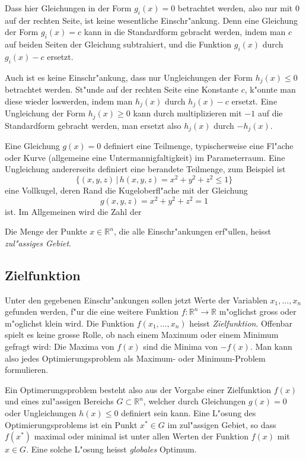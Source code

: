 Dass hier Gleichungen in der Form $g_i(x)=0$ betrachtet werden, also
nur mit $0$ auf der rechten Seite, ist keine wesentliche Einschr"ankung.
Denn eine Gleichung der Form $g_i(x)=c$ kann in die Standardform gebracht
werden, indem man $c$ auf beiden Seiten der Gleichung subtrahiert,
und die Funktion $g_i(x)$ durch $g_i(x)-c$ ersetzt.

Auch ist es keine Einschr"ankung, dass nur Ungleichungen der Form 
$h_j(x)\le 0$ betrachtet werden. St"unde auf der rechten Seite eine
Konstante $c$, k"onnte man diese wieder loswerden, indem man $h_j(x)$
durch $h_j(x)-c$ ersetzt. Eine Ungleichung der Form $h_j(x)\ge 0$
kann durch multiplizieren mit $-1$ auf die Standardform gebracht werden,
man ersetzt also $h_j(x)$ durch $-h_j(x)$.

Eine Gleichung $g(x)=0$ definiert eine Teilmenge, typischerweise eine
Fl"ache oder Kurve (allgemeine eine Untermannigfaltigkeit) im 
Parameterraum.
Eine Ungleichung andererseits definiert eine berandete Teilmenge,
zum Beispiel ist
\[
\{(x,y,z)\,|\,h(x,y,z)=x^2+y^2+z^2\le 1\}
\]
eine Vollkugel, deren Rand die Kugeloberfl"ache mit der Gleichung
\[
g(x,y,z)=x^2+y^2+z^2=1
\]
ist. Im Allgemeinen wird die Zahl der 

\begin{definition}
Die Menge der Punkte $x\in\mathbb R^n$, die alle Einschr"ankungen
erf"ullen, heisst {\em zul"assiges Gebiet}.
\end{definition}

\subsection{Zielfunktion}
Unter den gegebenen Einschr"ankungen sollen jetzt Werte der
Variablen $x_1,\dots,x_n$ gefunden werden, f"ur die eine weitere
Funktion $f\colon \mathbb R^n \to \mathbb R$ m"oglichst gross
oder m"oglichst klein wird.
Die Funktion $f(x_1,\dots,x_n)$ heisst {\em Zielfunktion}.
Offenbar spielt es keine grosse Rolle, ob nach einem Maximum oder einem
Minimum gefragt wird: Die Maxima von $f(x)$ sind die Minima von $-f(x)$.
Man kann also jedes Optimierungsproblem als Maximum- oder Minimum-Problem
formulieren.

Ein Optimerungsproblem besteht also aus der Vorgabe einer Zielfunktion
$f(x)$ und eines zul"assigen Bereichs $G\subset \mathbb R^n$, welcher
durch Gleichungen $g(x)=0$ oder Ungleichungen $h(x)\le 0$ 
definiert sein kann.
Eine L"osung des Optimierungsproblems ist ein Punkt $x^*\in G$ im zul"assigen
Gebiet, so dass $f(x^*)$ maximal oder minimal ist unter allen Werten
der Funktion $f(x)$ mit $x\in G$. Eine solche L"osung heisst
{\it globales} Optimum.

